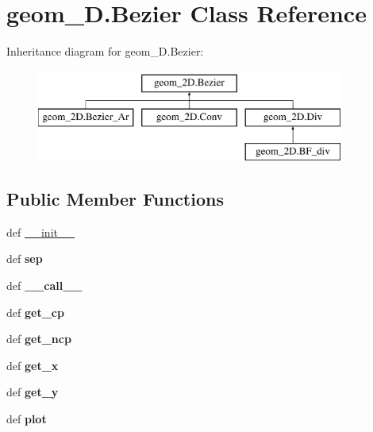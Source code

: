 \hypertarget{classgeom__2D_1_1Bezier}{\section{geom\-\_\-D.\-Bezier \-Class \-Reference}
\label{classgeom__2D_1_1Bezier}
}
\-Inheritance diagram for geom\-\_\-D.\-Bezier\-:\begin{figure}[H]
\begin{center}
\leavevmode
\includegraphics[height=3.000000cm]{classgeom__2D_1_1Bezier}
\end{center}
\end{figure}
\subsection*{\-Public \-Member \-Functions}
\begin{DoxyCompactItemize}
\item 
def \hyperlink{classgeom__2D_1_1Bezier_a57942b9390b8cb6e4245545661ee0e6b}{\-\_\-\-\_\-init\-\_\-\-\_\-}
\item 
\hypertarget{classgeom__2D_1_1Bezier_a5a5c7bd7306427c40aa976d6b5648909}{def {\bfseries sep}}\label{classgeom__2D_1_1Bezier_a5a5c7bd7306427c40aa976d6b5648909}

\item 
\hypertarget{classgeom__2D_1_1Bezier_a7627facb471c4d67d0f046460d37d38b}{def {\bfseries \-\_\-\-\_\-call\-\_\-\-\_\-}}\label{classgeom__2D_1_1Bezier_a7627facb471c4d67d0f046460d37d38b}

\item 
\hypertarget{classgeom__2D_1_1Bezier_a1c511284e0aa66764d016b5a2c7e9ab4}{def {\bfseries get\-\_\-cp}}\label{classgeom__2D_1_1Bezier_a1c511284e0aa66764d016b5a2c7e9ab4}

\item 
\hypertarget{classgeom__2D_1_1Bezier_a756cb59212797e9405dc6a4c1c2b07c7}{def {\bfseries get\-\_\-ncp}}\label{classgeom__2D_1_1Bezier_a756cb59212797e9405dc6a4c1c2b07c7}

\item 
\hypertarget{classgeom__2D_1_1Bezier_a659cf21f8e591685d99e82d3414c55a7}{def {\bfseries get\-\_\-x}}\label{classgeom__2D_1_1Bezier_a659cf21f8e591685d99e82d3414c55a7}

\item 
\hypertarget{classgeom__2D_1_1Bezier_af5420cd6be4a973b88e1d9401f8ff79b}{def {\bfseries get\-\_\-y}}\label{classgeom__2D_1_1Bezier_af5420cd6be4a973b88e1d9401f8ff79b}

\item 
\hypertarget{classgeom__2D_1_1Bezier_acaabdc283f18157a6525f2d47df24457}{def {\bfseries plot}}\label{classgeom__2D_1_1Bezier_acaabdc283f18157a6525f2d47df24457}

\end{DoxyCompactItemize}


